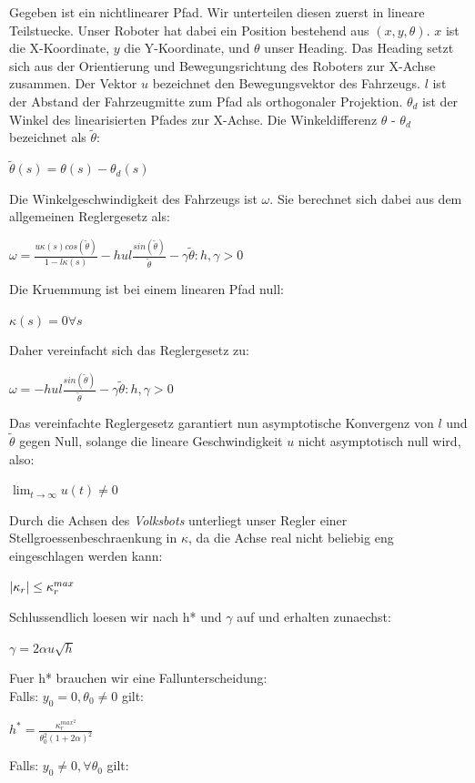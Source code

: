 \documentclass[11pt,a4paper]{article}
\DeclarePairedDelimiter\abs{\lvert}{\rvert}
\begin{document}
Gegeben ist ein nichtlinearer Pfad. Wir unterteilen diesen zuerst in lineare Teilstuecke. Unser Roboter hat dabei 
ein Position bestehend aus $(x,y,\theta)$. $x$ ist die X-Koordinate, $y$ die Y-Koordinate, und $\theta$ unser Heading.
Das Heading setzt sich aus der Orientierung und Bewegungsrichtung des Roboters zur X-Achse zusammen. Der Vektor $u$ bezeichnet den Bewegungsvektor des Fahrzeugs.
$l$ ist der Abstand der Fahrzeugmitte zum Pfad als orthogonaler Projektion. $\theta_d$ ist der Winkel des linearisierten Pfades zur X-Achse. Die Winkeldifferenz $\theta$ - $\theta_d$ bezeichnet 
\cite{INDIVERI2004185} als $\tilde{\theta}$: 

$\tilde{\theta}(s) = \theta(s) - \theta_d(s)$

Die Winkelgeschwindigkeit des Fahrzeugs ist $\omega$. Sie berechnet sich dabei aus dem allgemeinen Reglergesetz als:

$\omega = \frac{u\kappa(s)cos(\tilde{\theta})}{1-l\kappa(s)} - hul\frac{sin(\tilde{\theta})}{\tilde{\theta}}-\gamma\tilde{\theta} : h,\gamma > 0$

Die Kruemmung ist bei einem linearen Pfad null:

$\kappa(s) = 0 \forall s$

Daher vereinfacht sich das Reglergesetz zu:

$ \omega = -hul\frac{sin(\tilde{\theta})}{\tilde{\theta}}-\gamma\tilde{\theta} : h,\gamma > 0$

Das vereinfachte Reglergesetz garantiert nun asymptotische Konvergenz von $l$ und $\tilde{\theta}$ gegen Null, solange die lineare Geschwindigkeit $u$ nicht asymptotisch
null wird, also: 

$\lim_{t \to \infty} u(t) \neq 0$

Durch die Achsen des \textit{Volksbots} unterliegt unser Regler einer Stellgroessenbeschraenkung in $\kappa$, da die Achse real nicht beliebig eng eingeschlagen werden kann:

$\abs{\kappa_r} \leq \kappa_r^{max}$

Schlussendlich loesen wir nach h* und $\gamma$ auf und erhalten zunaechst:

$\gamma = 2\alpha u \sqrt{h}$

Fuer h* brauchen wir eine Fallunterscheidung: \\
Falls:
$ y_0 = 0, \theta_0 \neq 0$ gilt:

$h^* = \frac{\kappa_r^{max^2}}{\theta_0^2(1+2\alpha)^2}$

Falls:
$y_0 \neq 0, \forall \theta_0$ gilt: 
\end{document}
